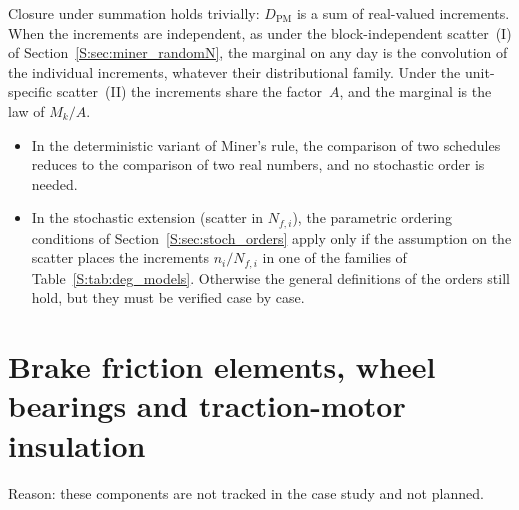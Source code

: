 \documentclass[11pt,a4paper]{article}
\theoremstyle{plain}
\theoremstyle{definition}
\theoremstyle{remark}
\begin{document}
Closure under summation holds trivially: $D_{\mathrm{PM}}$ is a sum of real-valued increments.
When the increments are independent, as under the block-independent scatter~(I) of Section~\ref{S:sec:miner_randomN}, the marginal on any day is the convolution of the individual increments, whatever their distributional family.
Under the unit-specific scatter~(II) the increments share the factor~$A$, and the marginal is the law of $M_k/A$.
\begin{itemize}
  \item In the deterministic variant of Miner's rule, the comparison of two schedules reduces to the comparison of two real numbers, and no stochastic order is needed.
  \item In the stochastic extension (scatter in $N_{f,i}$), the parametric ordering conditions of Section~\ref{S:sec:stoch_orders} apply only if the assumption on the scatter places the increments $n_i/N_{f,i}$ in one of the families of Table~\ref{S:tab:deg_models}.
    Otherwise the general definitions of the orders still hold, but they must be verified case by case.
\end{itemize}

\section{Brake friction elements, wheel bearings and traction-motor insulation}

Reason: these components are not tracked in the case study and not planned.
\end{document}
